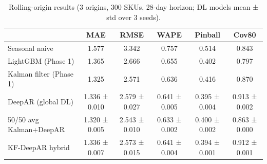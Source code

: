 \begin{table}[t]
\caption{Rolling-origin results (3 origins, 300 SKUs, 28-day horizon; DL models mean ± std over 3 seeds).}
\label{tab:main}
\begin{tabular}{lccccc}
\toprule
 & MAE & RMSE & WAPE & Pinball & Cov80 \\
\midrule
Seasonal naive & 1.577 & 3.342 & 0.757 & 0.514 & 0.843 \\
LightGBM (Phase 1) & 1.365 & 2.666 & 0.655 & 0.402 & 0.797 \\
Kalman filter (Phase 1) & 1.325 & 2.571 & 0.636 & 0.416 & 0.870 \\
DeepAR (global DL) & 1.336 ± 0.010 & 2.579 ± 0.027 & 0.641 ± 0.005 & 0.395 ± 0.004 & 0.913 ± 0.002 \\
50/50 avg Kalman+DeepAR & 1.320 ± 0.005 & 2.543 ± 0.010 & 0.633 ± 0.002 & 0.400 ± 0.002 & 0.863 ± 0.000 \\
KF-DeepAR hybrid & 1.336 ± 0.007 & 2.573 ± 0.015 & 0.641 ± 0.004 & 0.394 ± 0.001 & 0.912 ± 0.001 \\
\bottomrule
\end{tabular}
\end{table}

